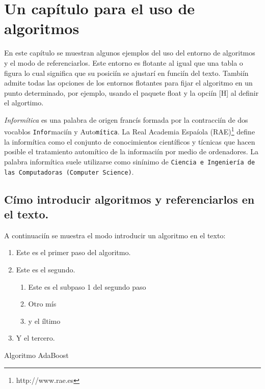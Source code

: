 \chapter{Un capítulo para el uso de algoritmos}

En este capítulo se muestran algunos ejemplos del uso del entorno de algoritmos y el modo de referenciarlos. Este entorno es flotante al igual que una tabla o figura lo cual significa que su posiciín se ajustarí en funciín del texto. Tambiín admite todas las opciones de los entornos flotantes para fijar el algoritmo en un punto determinado, por ejemplo, usando el paquete float y la opciín [H] al definir el algortimo.

\emph{Informítica} es una palabra de origen francís formada por la contracciín de dos vo\-ca\-blos \texttt{Infor}maciín y
Auto\texttt{mítica}. La Real Academia Espaíola (RAE)\footnote{http://www.rae.es} define la informítica como el
conjunto de conocimientos científicos y tícnicas que hacen posible el tratamiento automítico de la informaciín por medio de
ordenadores. La palabra informítica suele utilizarse como sinínimo de \texttt{Ciencia e Ingeniería de las Computadoras (Computer Science)}.

\section{Címo introducir algoritmos y referenciarlos en el texto.}

A continuaciín se muestra el modo introducir un algoritmo en el texto:

\begin{algorithm}[H]
 \begin{enumerate}
 \item Este es el primer paso del algoritmo.
 \item Este es el segundo.
    \begin{enumerate}
        \item Este es el subpaso 1 del segundo paso
        \item Otro mís
        \item y el íltimo
    \end{enumerate}
 \item Y el tercero.
 \end{enumerate}
 \caption{Algoritmo AdaBoost}
 \label{mialgoritmo1}
\end{algorithm}

